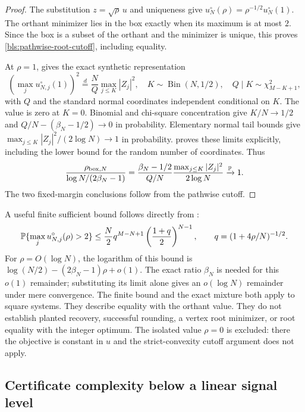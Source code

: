 \begin{proof}
The substitution $z=\sqrt\rho\,u$ and uniqueness give
$u_N^\circ(\rho)=\rho^{-1/2}u_N^\circ(1)$.
The orthant minimizer lies in the box exactly when its maximum is at most
$2$.  Since the box is a subset of the orthant and the minimizer is unique,
this proves \eqref{bls:pathwise-root-cutoff}, including equality.

At $\rho=1$,  gives the exact synthetic representation
\[
 \left(\max_j u_{N,j}^\circ(1)\right)^2
 \stackrel d=\frac NQ\max_{j\le K}|Z_j|^2,
 \quad K\sim\operatorname{Bin}(N,1/2),\quad
 Q\mid K\sim\chi^2_{M-K+1},
\]
with $Q$ and the standard normal coordinates independent conditional on
$K$.  The value is zero at $K=0$.  Binomial and chi-square concentration
give $K/N\to1/2$ and
$Q/N-(\beta_N-1/2)\to0$ in probability.  Elementary normal tail bounds
give $\max_{j\le K}|Z_j|^2/(2\log N)\to1$ in probability.
 proves these limits explicitly,
including the lower bound for the random number of coordinates.  Thus
\[
 \frac{\rho_{\mathrm{box},N}}{\log N/(2\beta_N-1)}
 =\frac{\beta_N-1/2}{Q/N}
   \frac{\max_{j\le K}|Z_j|^2}{2\log N}
 \xrightarrow{\mathbb{P}}1.
\]
The two fixed-margin conclusions follow from the pathwise cutoff.
\end{proof}

A useful finite sufficient bound follows directly from
:
\begin{equation}
 \mathbb{P}\{\max_j u_{N,j}^\circ(\rho)>2\}
 \le\frac N2q^{M-N+1}\left(\frac{1+q}{2}\right)^{N-1},
 \qquad q=(1+4\rho/N)^{-1/2}.
 \label{bls:root-inactivity-tail}
\end{equation}
For $\rho=O(\log N)$, the logarithm of this bound is
$\log(N/2)-(2\beta_N-1)\rho+o(1)$.
The exact ratio $\beta_N$ is needed for this $o(1)$ remainder; substituting
its limit alone gives an $o(\log N)$ remainder under mere convergence.
The finite bound and the exact mixture both apply to square systems.
They describe equality with the orthant value.  They do not establish
planted recovery, successful rounding, a vertex root minimizer, or root
equality with the integer optimum.  The isolated value $\rho=0$ is excluded:
there the objective is constant in $u$ and the strict-convexity cutoff
argument does not apply.

\subsection{Certificate complexity below a linear signal level}
\label{bls:hard-certificates}

